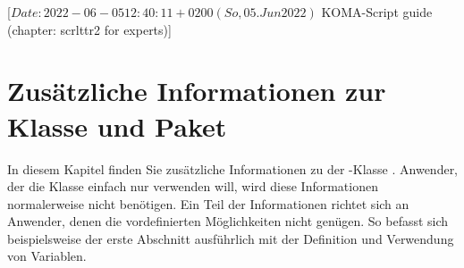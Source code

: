 %
%
%
%
%
%
%

%
                 [$Date: 2022-06-05 12:40:11 +0200 (So, 05. Jun 2022) $
                  KOMA-Script guide (chapter: scrlttr2 for experts)]

\chapter{Zusätzliche Informationen zur
  Klasse  und Paket }

\BeginIndexGroup%
%
In diesem Kapitel finden Sie zusätzliche Informationen zu der
\KOMAScript-Klasse . %
Anwender, der die Klasse einfach nur verwenden will, wird diese Informationen
normalerweise nicht benötigen. Ein Teil der Informationen richtet sich an
Anwender, denen die vordefinierten Möglichkeiten nicht genügen. So
befasst sich beispielsweise der erste Abschnitt ausführlich mit der Definition
und Verwendung von Variablen.%
\iffalse%
\ Darüber hinaus finden sich in diesem Kapitel auch Informationen über
Möglichkeiten, die aus Gründen der Verbesserung der Kompatibilität zur
obsoleten \KOMAScript-Klasse \Class{scrlettr} geschaffen wurden. Es wird auch
ausführlich erklärt, wie man einen Brief dieser veralteten Klasse auf die
aktuelle Briefklasse übertragen kann.  \fi

